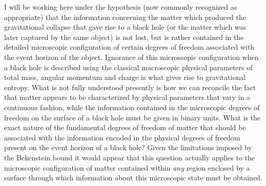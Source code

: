 \documentclass[notitlepage,12pt]{report}
\begin{document}
I will be working here under the hypothesis (now commonly recognized as appropriate) that the information concerning the matter which produced the gravitational collapse that gave rise to a black hole (or the matter which was later captured by the same object) is not lost, but is rather contained in the detailed microscopic configuration of certain degrees of freedom associated with the event horizon of the object. Ignorance of this microscopic configuration when a black hole is described using the classical macroscopic physical parameters of total mass, angular momentum and charge is what gives rise to gravitational entropy. What is not fully understood presently is how we can reconcile the fact that matter appears to be characterized by physical parameters that vary in a continuous fashion, while the information contained in the microscopic degrees of freedom on the surface of a black hole must be given in binary units. What is the exact nature of the fundamental degrees of freedom of matter that should be associated with the information encoded in the physical degrees of freedom present on the event horizon of a black hole? Given the limitations imposed by the Bekenstein bound it would appear that this question actually applies to the microscopic configuration of matter contained within \textit{any} region enclosed by a surface through which information about this microscopic state must be obtained.
\end{document}
